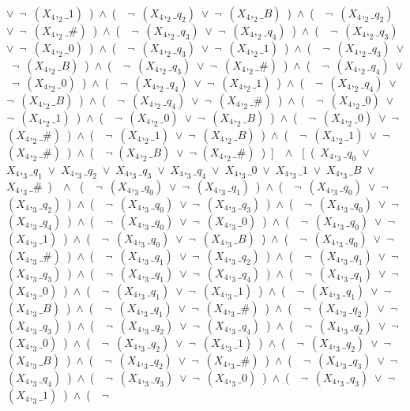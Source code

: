 ﻿\documentclass[a4paper,10pt]{article}
\begin{document}
$\vee$\ $\neg$\ $(X_4,_2\_1)$\ )\ $\wedge$\ (\ \ $\neg$\ $(X_4,_2\_q_2)$\ $\vee$\ $\neg$\ $(X_4,_2\_B)$\ )\ $\wedge$\ (\ \ $\neg$\ $(X_4,_2\_q_2)$\ $\vee$\ $\neg$\ $(X_4,_2\_\#)$\ )\ $\wedge$\ (\ \ $\neg$\ $(X_4,_2\_q_3)$\ $\vee$\ $\neg$\ $(X_4,_2\_q_4)$\ )\ $\wedge$\ (\ \ $\neg$\ $(X_4,_2\_q_3)$\ $\vee$\ $\neg$\ $(X_4,_2\_0)$\ )\ $\wedge$\ (\ \ $\neg$\ $(X_4,_2\_q_3)$\ $\vee$\ $\neg$\ $(X_4,_2\_1)$\ )\ $\wedge$\ (\ \ $\neg$\ $(X_4,_2\_q_3)$\ $\vee$\ $\neg$\ $(X_4,_2\_B)$\ )\ $\wedge$\ (\ \ $\neg$\ $(X_4,_2\_q_3)$\ $\vee$\ $\neg$\ $(X_4,_2\_\#)$\ )\ $\wedge$\ (\ \ $\neg$\ $(X_4,_2\_q_4)$\ $\vee$\ $\neg$\ $(X_4,_2\_0)$\ )\ $\wedge$\ (\ \ $\neg$\ $(X_4,_2\_q_4)$\ $\vee$\ $\neg$\ $(X_4,_2\_1)$\ )\ $\wedge$\ (\ \ $\neg$\ $(X_4,_2\_q_4)$\ $\vee$\ $\neg$\ $(X_4,_2\_B)$\ )\ $\wedge$\ (\ \ $\neg$\ $(X_4,_2\_q_4)$\ $\vee$\ $\neg$\ $(X_4,_2\_\#)$\ )\ $\wedge$\ (\ \ $\neg$\ $(X_4,_2\_0)$\ $\vee$\ $\neg$\ $(X_4,_2\_1)$\ )\ $\wedge$\ (\ \ $\neg$\ $(X_4,_2\_0)$\ $\vee$\ $\neg$\ $(X_4,_2\_B)$\ )\ $\wedge$\ (\ \ $\neg$\ $(X_4,_2\_0)$\ $\vee$\ $\neg$\ $(X_4,_2\_\#)$\ )\ $\wedge$\ (\ \ $\neg$\ $(X_4,_2\_1)$\ $\vee$\ $\neg$\ $(X_4,_2\_B)$\ )\ $\wedge$\ (\ \ $\neg$\ $(X_4,_2\_1)$\ $\vee$\ $\neg$\ $(X_4,_2\_\#)$\ )\ $\wedge$\ (\ \ $\neg$ $(X_4,_2\_B)$\ $\vee$\ $\neg$ $(X_4,_2\_\#)$\ )\ ]\ \ $\wedge$ \ [\ (\ $X_4,_3\_q_0$\ $\vee$\ $X_4,_3\_q_1$\ $\vee$\ $X_4,_3\_q_2$\ $\vee$\ $X_4,_3\_q_3$\ $\vee$\ $X_4,_3\_q_4$\ $\vee$\ $X_4,_3\_0$\ $\vee$\ $X_4,_3\_1$\ $\vee$\ $X_4,_3\_B$\ $\vee$\ $X_4,_3\_\#$\ )\ \ $\wedge$ \ (\ \ $\neg$\ $(X_4,_3\_q_0)$\ $\vee$\ $\neg$\ $(X_4,_3\_q_1)$\ )\ $\wedge$\ (\ \ $\neg$\ $(X_4,_3\_q_0)$\ $\vee$\ $\neg$\ $(X_4,_3\_q_2)$\ )\ $\wedge$\ (\ \ $\neg$\ $(X_4,_3\_q_0)$\ $\vee$\ $\neg$\ $(X_4,_3\_q_3)$\ )\ $\wedge$\ (\ \ $\neg$\ $(X_4,_3\_q_0)$\ $\vee$\ $\neg$\ $(X_4,_3\_q_4)$\ )\ $\wedge$\ (\ \ $\neg$\ $(X_4,_3\_q_0)$\ $\vee$\ $\neg$\ $(X_4,_3\_0)$\ )\ $\wedge$\ (\ \ $\neg$\ $(X_4,_3\_q_0)$\ $\vee$\ $\neg$\ $(X_4,_3\_1)$\ )\ $\wedge$\ (\ \ $\neg$\ $(X_4,_3\_q_0)$\ $\vee$\ $\neg$\ $(X_4,_3\_B)$\ )\ $\wedge$\ (\ \ $\neg$\ $(X_4,_3\_q_0)$\ $\vee$\ $\neg$\ $(X_4,_3\_\#)$\ )\ $\wedge$\ (\ \ $\neg$\ $(X_4,_3\_q_1)$\ $\vee$\ $\neg$\ $(X_4,_3\_q_2)$\ )\ $\wedge$\ (\ \ $\neg$\ $(X_4,_3\_q_1)$\ $\vee$\ $\neg$\ $(X_4,_3\_q_3)$\ )\ $\wedge$\ (\ \ $\neg$\ $(X_4,_3\_q_1)$\ $\vee$\ $\neg$\ $(X_4,_3\_q_4)$\ )\ $\wedge$\ (\ \ $\neg$\ $(X_4,_3\_q_1)$\ $\vee$\ $\neg$\ $(X_4,_3\_0)$\ )\ $\wedge$\ (\ \ $\neg$\ $(X_4,_3\_q_1)$\ $\vee$\ $\neg$\ $(X_4,_3\_1)$\ )\ $\wedge$\ (\ \ $\neg$\ $(X_4,_3\_q_1)$\ $\vee$\ $\neg$\ $(X_4,_3\_B)$\ )\ $\wedge$\ (\ \ $\neg$\ $(X_4,_3\_q_1)$\ $\vee$\ $\neg$\ $(X_4,_3\_\#)$\ )\ $\wedge$\ (\ \ $\neg$\ $(X_4,_3\_q_2)$\ $\vee$\ $\neg$\ $(X_4,_3\_q_3)$\ )\ $\wedge$\ (\ \ $\neg$\ $(X_4,_3\_q_2)$\ $\vee$\ $\neg$\ $(X_4,_3\_q_4)$\ )\ $\wedge$\ (\ \ $\neg$\ $(X_4,_3\_q_2)$\ $\vee$\ $\neg$\ $(X_4,_3\_0)$\ )\ $\wedge$\ (\ \ $\neg$\ $(X_4,_3\_q_2)$\ $\vee$\ $\neg$\ $(X_4,_3\_1)$\ )\ $\wedge$\ (\ \ $\neg$\ $(X_4,_3\_q_2)$\ $\vee$\ $\neg$\ $(X_4,_3\_B)$\ )\ $\wedge$\ (\ \ $\neg$\ $(X_4,_3\_q_2)$\ $\vee$\ $\neg$\ $(X_4,_3\_\#)$\ )\ $\wedge$\ (\ \ $\neg$\ $(X_4,_3\_q_3)$\ $\vee$\ $\neg$\ $(X_4,_3\_q_4)$\ )\ $\wedge$\ (\ \ $\neg$\ $(X_4,_3\_q_3)$\ $\vee$\ $\neg$\ $(X_4,_3\_0)$\ )\ $\wedge$\ (\ \ $\neg$\ $(X_4,_3\_q_3)$\ $\vee$\ $\neg$\ $(X_4,_3\_1)$\ )\ $\wedge$\ (\ \ $\neg$\ 
\end{document}

